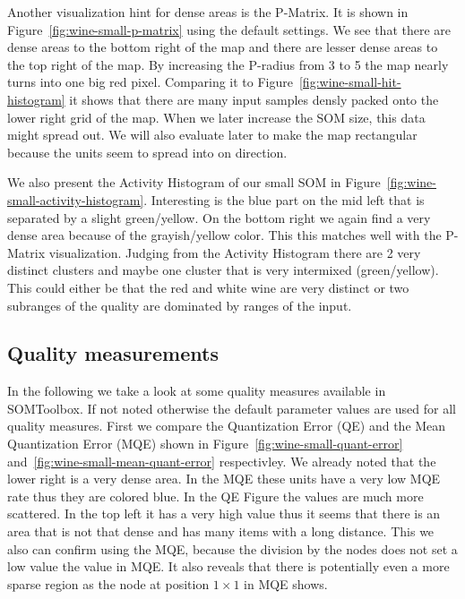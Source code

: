 \documentclass{acm_proc_article-sp}
\begin{document}
Another visualization hint for dense areas is the P-Matrix. It is shown in Figure~\ref{fig:wine-small-p-matrix} using
the default settings. We see that there are dense areas to the bottom right of the map and there are lesser
dense areas to the top right of the map.
By increasing the P-radius from 3 to 5 the map nearly turns into one big red pixel.
Comparing it to Figure~\ref{fig:wine-small-hit-histogram} it shows that there are many input samples densly packed
onto the lower right grid of the map. When we later increase the SOM size, this data might spread out. We
will also evaluate later to make the map rectangular because the units seem to spread into on direction.

We also present the Activity Histogram of our small SOM in Figure~\ref{fig:wine-small-activity-histogram}.
Interesting is the blue part on the mid left that is separated by a slight green/yellow.
On the bottom right we again find a very dense area because of the grayish/yellow color. This this matches
well with the P-Matrix visualization. Judging from the Activity Histogram there are 2 very distinct clusters
and maybe one cluster that is very intermixed (green/yellow). This could either be that the
red and white wine are very distinct or two subranges of the quality are dominated by ranges of the input.

\subsection{Quality measurements}

In the following we take a look at some quality measures available in SOMToolbox.
If not noted otherwise the default parameter values are used for all quality measures.
First we compare the Quantization Error (QE) and the Mean Quantization Error (MQE) shown in
Figure~\ref{fig:wine-small-quant-error} and~\ref{fig:wine-small-mean-quant-error} respectivley.
We already noted that the lower right is a very dense area. In the MQE these units have a very low
MQE rate thus they are colored blue. In the QE Figure the values are much more scattered. In
the top left it has a very high value thus it seems that there is an area that is not that dense
and has many items with a long distance. This we also can confirm using the MQE, because the division
by the nodes does not set a low value the value in MQE. It also reveals that there is potentially even a more sparse
region as the node at position $1\times1$ in MQE shows.
\end{document}
